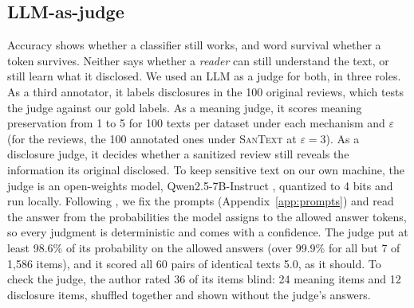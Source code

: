 \documentclass[11pt]{article}
\newcommand{\santext}{\textsc{SanText}}
\begin{document}
\subsection{LLM-as-judge}
Accuracy shows whether a classifier still works, and word survival whether a token survives. Neither says whether a \emph{reader} can still understand the text, or still learn what it disclosed. We used an LLM as a judge for both, in three roles. As a third annotator, it labels disclosures in the 100 original reviews, which tests the judge against our gold labels. As a meaning judge, it scores meaning preservation from 1 to 5 for 100 texts per dataset under each mechanism and $\varepsilon$ (for the reviews, the 100 annotated ones under \santext{} at $\varepsilon = 3$). As a disclosure judge, it decides whether a sanitized review still reveals the information its original disclosed. To keep sensitive text on our own machine, the judge is an open-weights model, Qwen2.5-7B-Instruct \citep{qwen2.5}, quantized to 4 bits and run locally. Following \citet{zheng2023judging}, we fix the prompts (Appendix~\ref{app:prompts}) and read the answer from the probabilities the model assigns to the allowed answer tokens, so every judgment is deterministic and comes with a confidence. The judge put at least 98.6\% of its probability on the allowed answers (over 99.9\% for all but 7 of 1,586 items), and it scored all 60 pairs of identical texts 5.0, as it should. To check the judge, the author rated 36 of its items blind: 24 meaning items and 12 disclosure items, shuffled together and shown without the judge's answers.
\end{document}
